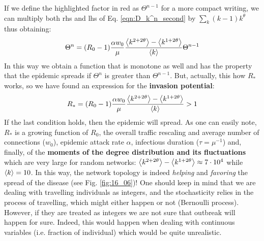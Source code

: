 \documentclass[../main/main.tex]{subfiles}
\begin{document}
If we define the highlighted factor in red as $\Theta^{n-1}$ for a more compact writing, we can multiply both rhs and lhs of Eq. \ref{eqn:D_k^n_second} by $\sum_k (k-1)k^\theta$ thus obtaining:
\begin{equation}
    \Theta^n = (R_0 - 1) \frac{\alpha w_0}{\mu} \frac{\expval{k^{2+2\theta}}- \expval{k^{1+2\theta}}}{\expval{k}} \Theta^{n-1}
\end{equation}
In this way we obtain a function that is monotone as well and has the property that the epidemic spreads if $\Theta^n$ is greater than $\Theta^{n-1}$. But, actually, this how $R_*$ works, so we have found an expression for the \textbf{invasion potential}:
\begin{equation}
    R_* = (R_0 - 1) \frac{\alpha w_0}{\mu} \frac{\expval{k^{2+2\theta}}- \expval{k^{1+2\theta}}}{\expval{k}} > 1
    \label{eqn:R_*_def}
\end{equation}
If the last condition holds, then the epidemic will spread. As one can easily note, $R_*$ is a growing function of $R_0$, the overall traffic rescaling and average number of connections ($w_0$), epidemic attack rate $\alpha$, infectious duration ($\tau = \mu^{-1}$) and, finally, of the \textbf{moments of the degree distribution and its fluctuations} which are very large for random networks: $\expval{k^{2+2\theta}}- \expval{k^{1+2\theta}} \approx 7\cdot 10^4$ while $\expval{k}= 10$. In this way, the network topology is indeed \textit{helping} and \textit{favoring}
 the spread of the disease (see Fig. \ref{fig:16_06})!
One should keep in mind that we are dealing with travelling individuals as integers, and the stochasticity relies in the process of travelling, which might either happen or not (Bernoulli process). However, if they are treated as integers we are not sure that outbreak will happen for sure. Indeed, this would happen when dealing with continuous variables (i.e. fraction of individual) which would be quite unrealistic.
\end{document}
